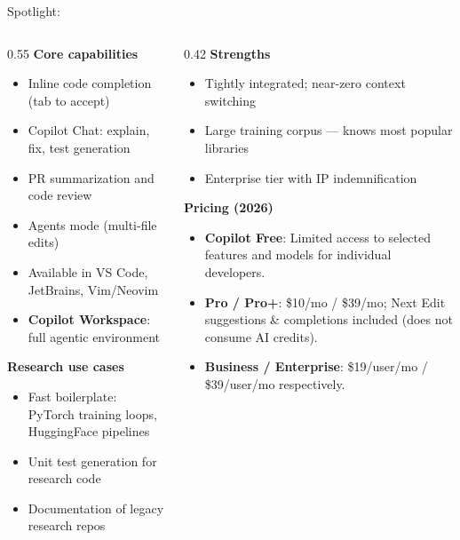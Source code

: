 \begin{frame}[shrink=10]{Spotlight: }
  \begin{columns}[T, onlytextwidth]
    \begin{column}{0.55\textwidth}
      \textbf{Core capabilities}\\[0.3em]
      \begin{itemize}
        \item Inline code completion (tab to accept)
        \item Copilot Chat: explain, fix, test generation
        \item PR summarization and code review
        \item Agents mode (multi-file edits)
        \item Available in VS Code, JetBrains, Vim/Neovim
        \item \textbf{Copilot Workspace}: full agentic environment
      \end{itemize}
      \vspace{0.5em}
      \textbf{Research use cases}\\[0.3em]
      \begin{itemize}
        \item Fast boilerplate: PyTorch training loops, HuggingFace pipelines
        \item Unit test generation for research code
        \item Documentation of legacy research repos
      \end{itemize}
    \end{column}
    \hfill
    \begin{column}{0.42\textwidth}
      \textbf{Strengths}\\
      \begin{itemize}
        \item Tightly integrated; near-zero context switching
        \item Large training corpus — knows most popular libraries
        \item Enterprise tier with IP indemnification
      \end{itemize}
      \vspace{0.5em}
      \textbf{Pricing (2026)}\\
      \begin{itemize}
        \item \textbf{Copilot Free}: Limited access to selected features and models for individual developers.
        \item \textbf{Pro / Pro+}: \$10/mo / \$39/mo; Next Edit suggestions \& completions included (does not consume AI credits).
        \item \textbf{Business / Enterprise}: \$19/user/mo / \$39/user/mo respectively.
      \end{itemize}
    \end{column}
  \end{columns}
\end{frame}

